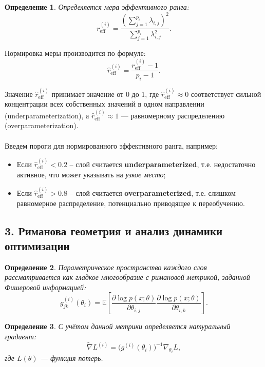 \documentclass[a4paper,12pt]{article}
\newtheorem{definition}{Определение}
\begin{document}
\begin{definition}
Определяется мера эффективного ранга:
\begin{equation}
r_{\text{eff}}^{(i)} = \frac{\left(\sum_{j=1}^{p_i} \lambda_{i,j}\right)^2}{\sum_{j=1}^{p_i}\lambda_{i,j}^2}.
\end{equation}
\end{definition}

Нормировка меры производится по формуле:
\begin{equation}
\hat{r}_{\text{eff}}^{(i)} = \frac{r_{\text{eff}}^{(i)} - 1}{p_i - 1}.
\end{equation}

Значение \(\hat{r}_{\text{eff}}^{(i)}\) принимает значение от 0 до 1, где \(\hat{r}_{\text{eff}}^{(i)} \approx 0\) соответствует сильной концентрации всех собственных значений в одном направлении (underparameterization), а \(\hat{r}_{\text{eff}}^{(i)} \approx 1\) --- равномерному распределению (overparameterization).\\\\
Введем пороги для нормированного эффективного ранга, например:
\begin{itemize}[leftmargin=0.5cm]
    \item Если \(\hat{r}_{\text{eff}}^{(i)} < 0.2\) – слой считается \textbf{underparameterized}, т.е. недостаточно активное, что может указывать на \textit{узкое место};
    \item Если \(\hat{r}_{\text{eff}}^{(i)} > 0.8\) – слой считается \textbf{overparameterized}, т.е. слишком равномерное распределение, потенциально приводящее к переобучению.
\end{itemize}

\subsection*{3. Риманова геометрия и анализ динамики оптимизации}

\begin{definition}
Параметрическое пространство каждого слоя рассматривается как гладкое многообразие с римановой метрикой, заданной Фишеровой информацией:
\begin{equation}
g^{(i)}_{jk}(\theta_i) = \mathbb{E}\left[\frac{\partial \log p(x;\theta)}{\partial \theta_{i,j}} \frac{\partial \log p(x;\theta)}{\partial \theta_{i,k}}\right].
\end{equation}
\end{definition}

\begin{definition}
С учётом данной метрики определяется \emph{натуральный градиент}:
\begin{equation}
\tilde{\nabla} L^{(i)} = \bigl(g^{(i)}(\theta_i)\bigr)^{-1}\nabla_{\theta_i} L,
\end{equation}
где \( L(\theta) \) --- функция потерь.
\end{definition}
\end{document}
